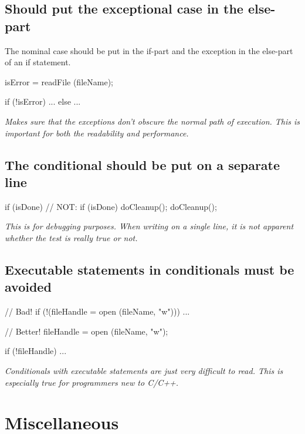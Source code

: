 \documentclass[a4paper,11pt,oneside]{scrbook}
\newcommand{\guideline}[1]{{\subsection{#1}}}
\newcommand{\motivation}[1]{{\normalfont \itshape #1}}
\newcommand{\trcode}[1]{{\normalfont \ttfamily #1}}
\begin{document}
\guideline{Should put the exceptional case in the \trcode{else}-part}

The nominal case should be put in the \trcode{if}-part and the exception in the
\trcode{else}-part of an \trcode{if} statement.

\begin{code}
  isError = readFile (fileName);

  if (!isError) {
    ...
  }
  else {
    ...
  } 
\end{code}

\motivation{
  Makes sure that the exceptions don't obscure the normal path of
  execution. This is important for both the readability and performance.
}

\guideline{The conditional should be put on a separate line}

\begin{code}
  if (isDone) {            // NOT: if (isDone) { doCleanup(); }
    doCleanup();
  } 
\end{code}

\motivation{
  This is for debugging purposes. When writing on a single line, it is
  not apparent whether the test is really true or not.
}

\guideline{Executable statements in conditionals must be avoided}

\begin{code}
  // Bad!
  if (!(fileHandle = open (fileName, "w"))) { 
    ... 
  } 

  // Better!
  fileHandle = open (fileName, "w");

  if (!fileHandle) {
    ...
  }
\end{code}

\motivation{ 
  Conditionals with executable statements are just very
  difficult to read. This is especially true for programmers new to
  C/C++.
}

\section{Miscellaneous}
\end{document}
